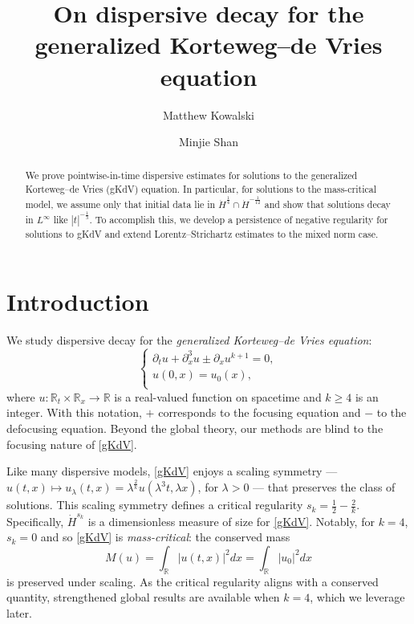 \documentclass[10pt, reqno]{amsart}
\numberwithin{equation}{section}
\newcommand{\R}{\mathbb{R}}
\theoremstyle{definition}
\theoremstyle{remark}
\begin{document}
\title[On dispersive decay for gKdV]{On dispersive decay for the generalized Korteweg--de Vries equation}

\author[M.~Kowalski]{Matthew Kowalski}
\address{Department of Mathematics, University of California, Los Angeles, CA 90095, USA}

\author[M.~Shan]{Minjie Shan}
\address{College of Science, Minzu University of China, Beijing 100081, P. R. China}


\begin{abstract}
    We prove pointwise-in-time dispersive estimates for solutions to the generalized Korteweg--de Vries (gKdV) equation.
    In particular, for solutions to the mass-critical model, we assume only that initial data lie in $\dot{H}^{\frac{1}{4}} \cap \dot{H}^{-\frac{1}{12}}$ and show that solutions decay in $L^\infty$ like $|t|^{-\frac{1}{3}}$. To accomplish this, we develop a persistence of negative regularity for solutions to gKdV and extend Lorentz--Strichartz estimates to the mixed norm case.
\end{abstract}

\maketitle


\section{Introduction}
\noindent We study dispersive decay for the {\em generalized Korteweg--de Vries equation}:
\begin{equation}\label{gKdV}\tag{gKdV}
	\begin{cases}
		\partial_{t}u +\partial_{x}^{3} u \pm \partial_{x} u^{k+1} = 0, \\
		u(0,x)=u_0(x),  \\
    \end{cases}
\end{equation}
where $u : \R_t \times \R_x \to \R$ is a real-valued function on spacetime and $k \geq 4$ is an integer. With this notation, $+$ corresponds to the focusing equation and $-$ to the defocusing equation. Beyond the global theory, our methods are blind to the focusing nature of \eqref{gKdV}.

Like many dispersive models, \eqref{gKdV} enjoys a scaling symmetry ---
$ u(t, x) \mapsto u_{\lambda}(t, x) = \lambda^{\frac{2}{k}} u ( \lambda^{3}t, \lambda x) $, for $\lambda > 0$ --- that preserves the class of solutions. This scaling symmetry defines a critical regularity $s_k = \frac{1}{2} - \frac{2}{k}$. Specifically, $\dot{H}^{s_k}$ is a dimensionless measure of size for \eqref{gKdV}. Notably, for $k = 4$, $s_k = 0$ and so \eqref{gKdV} is {\em mass-critical}: the conserved mass
\begin{equation*}
    M(u)=\int_{\R}|u(t, x)|^2 dx = \int_\R |u_0|^2 dx
\end{equation*}
is preserved under scaling. As the critical regularity aligns with a conserved quantity, strengthened global results are available when $k = 4$, which we leverage later.
\end{document}
